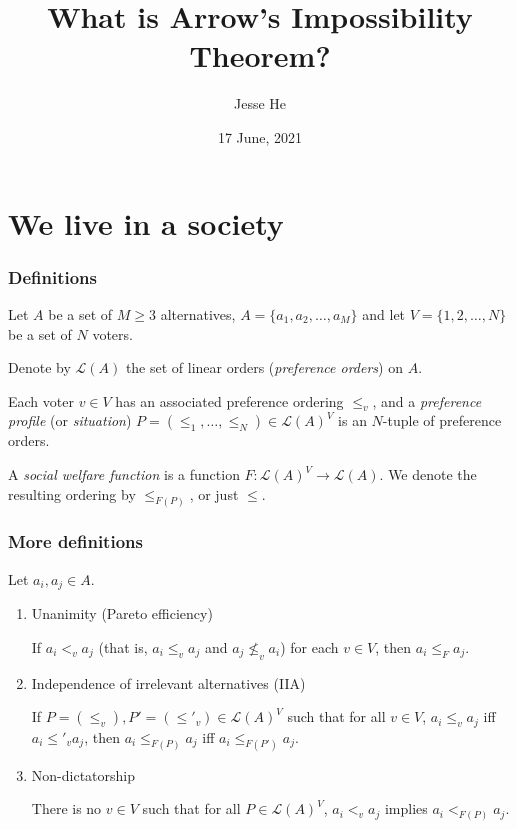 \documentclass{beamer}
\title{What is Arrow's Impossibility Theorem?}
\author{Jesse He}
\institute{OSU What Is?}
\date{17 June, 2021}
\theoremstyle{definition}
\begin{document}
    
\frame{\titlepage}

\section{We live in a society}

\begin{frame}
    \frametitle{Definitions}
    
    Let $A$ be a set of $M \geq 3$ alternatives, $A = \{a_1, a_2, \dots, a_M\}$ and let $V = \{1, 2, \dots, N\}$ be a set of $N$ voters.

    \pause
    Denote by $\mathcal{L}(A)$ the set of linear orders (\emph{preference orders}) on $A$.

    \pause
    Each voter $v \in V$ has an associated preference ordering $\leq_v$, and a \emph{preference profile} (or \emph{situation})
    $P = (\leq_1, \dots, \leq_N) \in \mathcal{L}(A)^V$ is an $N$-tuple of preference orders.

    \pause
    A \emph{social welfare function} is a function $F : \mathcal{L}(A)^V \to \mathcal{L}(A)$. We denote the resulting ordering by $\leq_{F(P)}$,
    or just $\leq$.
\end{frame}

\begin{frame}
    \frametitle{More definitions}

    Let $a_i, a_j \in A$.

    \begin{enumerate}
        \item Unanimity (Pareto efficiency)
        
        If $a_i <_v a_j$ (that is, $a_i \leq_v a_j$ and $a_j \not\leq_v a_i$) for each $v \in V$, then $a_i \leq_F a_j$.

        \item Independence of irrelevant alternatives (IIA)
        
        If $P = (\leq_v), P' = (\leq'_v) \in \mathcal{L}(A)^V$ such that for all $v \in V$, $a_i \leq_v a_j$
        iff $a_i \leq'_v a_j$, then $a_i \leq_{F(P)} a_j$ iff $a_i \leq_{F(P')} a_j$.

        \item Non-dictatorship
        
        There is no $v \in V$ such that for all $P \in \mathcal{L}(A)^V$, $a_i <_v a_j$ implies $a_i <_{F(P)} a_j$.
    \end{enumerate}

\end{frame}
\end{document}
